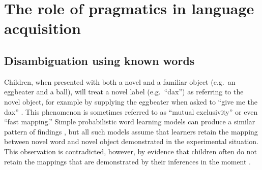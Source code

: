 \documentclass{article} %
\begin{document}
\section{The role of pragmatics in language acquisition}

\subsection{Disambiguation using known words}


Children, when presented with both a novel and a familiar object
(e.g.~an eggbeater and a ball), will treat a novel label
(e.g.~``dax'') as referring to the novel object, for example by
supplying the eggbeater when asked to ``give me the dax''
\cite{markman1988}. This phenomenon is sometimes referred to as
``mutual exclusivity'' or even ``fast mapping.'' Simple probabilistic word learning models can produce a
similar pattern of findings \cite{frank2009}, but all such models assume that learners retain the
mapping between novel word and novel object demonstrated in the
experimental situation. This observation is contradicted, however, by
evidence that children often do not retain the mappings that are
demonstrated by their inferences in the moment \cite{horst2008}.
\end{document}
